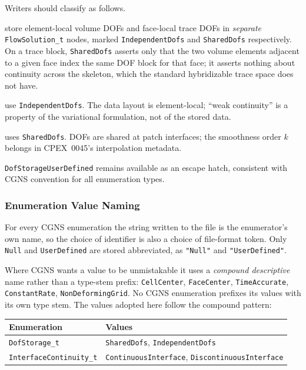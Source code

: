 \documentclass[11pt,letterpaper]{article}
\begin{document}
Writers should classify as follows.

\begin{description}[leftmargin=2em]
\item[HDG and mixed-layout methods] store element-local volume DOFs and
  face-local trace DOFs in \emph{separate} \texttt{FlowSolution\_t}
  nodes, marked \texttt{IndependentDofs} and \texttt{SharedDofs}
  respectively.  On a trace block, \texttt{SharedDofs} asserts only
  that the two volume elements adjacent to a given face index the same
  DOF block for that face; it asserts nothing about continuity across
  the skeleton, which the standard hybridizable trace space does not
  have.

\item[Penalized / weakly-continuous DG methods] use
  \texttt{IndependentDofs}.  The data layout is element-local; ``weak
  continuity'' is a property of the variational formulation, not of the
  stored data.

\item[Isogeometric analysis ($C^k$, $k \geq 1$)] uses
  \texttt{SharedDofs}.  DOFs are shared at patch interfaces; the
  smoothness order $k$ belongs in CPEX~0045's interpolation metadata.
\end{description}

\texttt{DofStorageUserDefined} remains available as an escape hatch,
consistent with CGNS convention for all enumeration types.

\subsubsection{Enumeration Value Naming}
\label{sec:value-naming}

For every CGNS enumeration the string written to the file is the
enumerator's own name, so the choice of identifier is also a choice of
file-format token.  Only \texttt{Null} and \texttt{UserDefined} are
stored abbreviated, as \texttt{"Null"} and \texttt{"UserDefined"}.

Where CGNS wants a value to be unmistakable it uses a \emph{compound
descriptive} name rather than a type-stem prefix: \texttt{CellCenter},
\texttt{FaceCenter}, \texttt{TimeAccurate}, \texttt{ConstantRate},
\texttt{NonDeformingGrid}.  No CGNS enumeration prefixes its values
with its own type stem.  The values adopted here follow the compound
pattern:

\begin{center}
\begin{tabular}{ll}
\toprule
\textbf{Enumeration} & \textbf{Values} \\
\midrule
\texttt{DofStorage\_t}
  & \texttt{SharedDofs}, \texttt{IndependentDofs} \\
\texttt{InterfaceContinuity\_t}
  & \texttt{ContinuousInterface}, \texttt{DiscontinuousInterface} \\
\bottomrule
\end{tabular}
\end{center}
\end{document}
